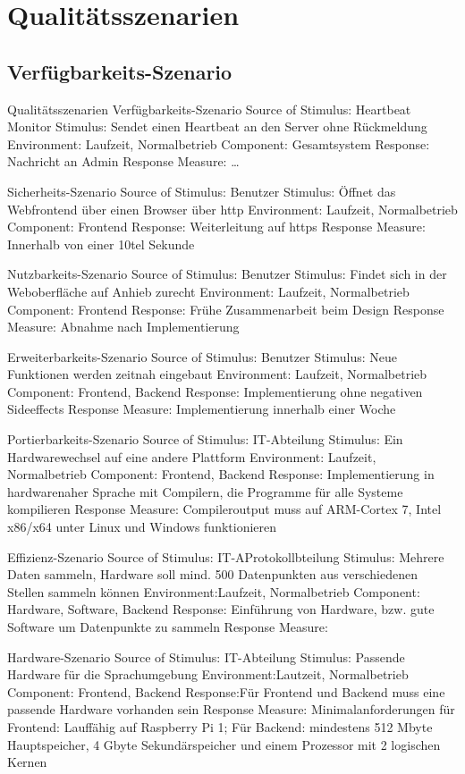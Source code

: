 \chapter{Qualitätsszenarien}
\section{Verfügbarkeits-Szenario}
Qualitätsszenarien
Verfügbarkeits-Szenario
Source of Stimulus: Heartbeat Monitor
Stimulus: Sendet einen Heartbeat an den Server ohne Rückmeldung
Environment: Laufzeit, Normalbetrieb
Component: Gesamtsystem
Response: Nachricht an Admin
Response Measure: …

Sicherheits-Szenario
Source of Stimulus: Benutzer
Stimulus: Öffnet das Webfrontend über einen Browser über http
Environment: Laufzeit, Normalbetrieb
Component: Frontend
Response: Weiterleitung auf https
Response Measure: Innerhalb von einer 10tel Sekunde

Nutzbarkeits-Szenario
Source of Stimulus: Benutzer
Stimulus: Findet sich in der Weboberfläche auf Anhieb zurecht
Environment: Laufzeit, Normalbetrieb
Component: Frontend
Response: Frühe Zusammenarbeit beim Design
Response Measure: Abnahme nach Implementierung

Erweiterbarkeits-Szenario
Source of Stimulus: Benutzer
Stimulus: Neue Funktionen werden zeitnah eingebaut
Environment: Laufzeit, Normalbetrieb
Component: Frontend, Backend
Response: Implementierung ohne negativen Sideeffects
Response Measure: Implementierung innerhalb einer Woche 

Portierbarkeits-Szenario
Source of Stimulus: IT-Abteilung
Stimulus: Ein Hardwarewechsel auf eine andere Plattform
Environment: Laufzeit, Normalbetrieb
Component: Frontend, Backend
Response: Implementierung in hardwarenaher Sprache mit Compilern, die Programme für alle Systeme kompilieren 
Response Measure: Compileroutput muss auf ARM-Cortex 7, Intel x86/x64 unter Linux und Windows funktionieren

Effizienz-Szenario
Source of Stimulus: IT-AProtokollbteilung
Stimulus: Mehrere Daten sammeln, Hardware soll mind. 500 Datenpunkten aus verschiedenen Stellen sammeln können
Environment:Laufzeit, Normalbetrieb
Component: Hardware, Software, Backend
Response: Einführung von Hardware, bzw. gute Software um Datenpunkte zu sammeln
Response Measure: 

Hardware-Szenario
Source of Stimulus: IT-Abteilung
Stimulus: Passende Hardware für die Sprachumgebung
Environment:Lautzeit, Normalbetrieb
Component: Frontend, Backend
Response:Für Frontend und Backend muss eine passende Hardware vorhanden sein
Response Measure: Minimalanforderungen für Frontend: Lauffähig auf Raspberry Pi 1; Für Backend: mindestens 512 Mbyte Hauptspeicher, 4 Gbyte Sekundärspeicher und einem Prozessor mit 2 logischen Kernen




